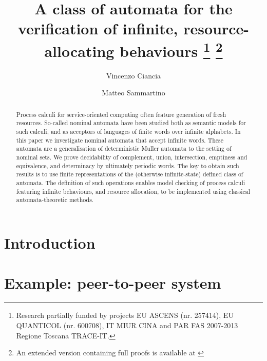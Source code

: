 \documentclass[orivec]{llncs}
\title{A class of automata for the verification of infinite, resource-allocating behaviours
\thanks{Research partially funded by projects EU 
 ASCENS (nr. 257414), EU QUANTICOL (nr. 600708), 
 IT MIUR CINA and PAR FAS 2007-2013 Regione Toscana TRACE-IT.}
 \thanks{An extended version containing full proofs is available at \cite{arxivCS}}
}
\author{Vincenzo Ciancia\inst{1} \and Matteo Sammartino\inst{2}}
\institute{ISTI-CNR, Pisa \and Dipartimento di Informatica, Universit\`a di Pisa, Pisa }
\begin{document}
\maketitle

\begin{abstract}
Process calculi for service-oriented computing often feature generation of fresh resources. So-called nominal automata have been studied both as semantic models for such calculi, and as acceptors of languages of finite words over infinite alphabets. In this paper we investigate nominal automata that accept infinite words. These automata are a generalisation of deterministic Muller automata to the setting of nominal sets. We prove decidability of complement, union, intersection, emptiness and equivalence, and determinacy by ultimately periodic words. The key to obtain such results is to use finite representations of the (otherwise infinite-state) defined class of automata. The definition of such operations enables model checking of process calculi featuring infinite behaviours, and resource allocation, to be implemented using classical automata-theoretic methods.
% 
\end{abstract}

\section{Introduction}\label{sec:introduction}

\section{Example: peer-to-peer system}\label{sec:example}

\end{document}

